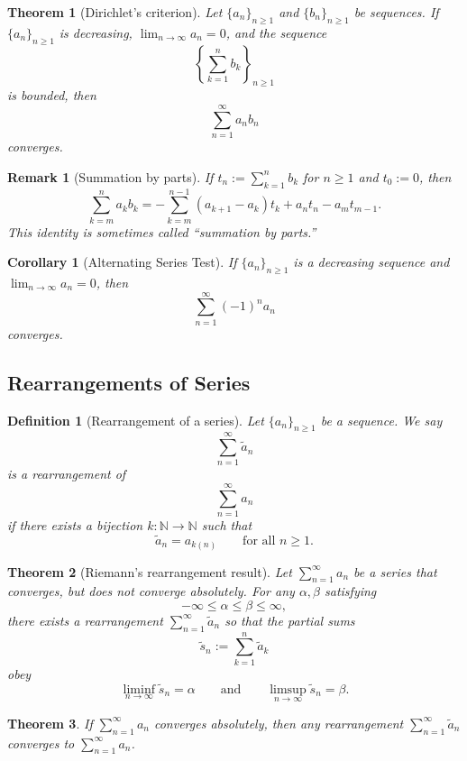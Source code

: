 \documentclass[12pt]{article}
\newtheorem*{remark}{Remark}
\newtheorem{theorem}{Theorem}
\newtheorem{corollary}{Corollary}
\newtheorem{definition}{Definition}
\begin{document}
\begin{theorem}[Dirichlet's criterion]
Let $\{a_n\}_{n\ge 1}$ and $\{b_n\}_{n\ge 1}$ be sequences. If
$\{a_n\}_{n\ge 1}$ is decreasing, $\lim_{n\to\infty} a_n=0$, and the sequence
\[
\left\{ \sum_{k=1}^{n} b_k \right\}_{n\ge 1}
\]
is bounded, then
\[
\sum_{n=1}^{\infty} a_n b_n
\]
converges.
\end{theorem}

\begin{remark}[Summation by parts]
If $t_n:=\sum_{k=1}^{n} b_k$ for $n\ge 1$ and $t_0:=0$, then
\[
\sum_{k=m}^{n} a_k b_k
= -\sum_{k=m}^{n-1} (a_{k+1}-a_k)t_k + a_n t_n - a_m t_{m-1}.
\]
This identity is sometimes called ``summation by parts.''
\end{remark}

\begin{corollary}[Alternating Series Test]
If $\{a_n\}_{n\ge 1}$ is a decreasing sequence and $\lim_{n\to\infty} a_n=0$,
then
\[
\sum_{n=1}^{\infty} (-1)^n a_n
\]
converges.
\end{corollary}

\subsection*{Rearrangements of Series}

\begin{definition}[Rearrangement of a series]
Let $\{a_n\}_{n\ge 1}$ be a sequence. We say
\[
\sum_{n=1}^{\infty} \tilde{a}_n
\]
is a rearrangement of
\[
\sum_{n=1}^{\infty} a_n
\]
if there exists a bijection $k:\mathbb{N}\to\mathbb{N}$ such that
\[
\tilde{a}_n = a_{k(n)}
\qquad \text{for all } n\ge 1.
\]
\end{definition}

\begin{theorem}[Riemann's rearrangement result]
Let $\sum_{n=1}^{\infty} a_n$ be a series that converges, but does not
converge absolutely. For any $\alpha,\beta$ satisfying
\[
-\infty\le \alpha\le \beta\le \infty,
\]
there exists a rearrangement $\sum_{n=1}^{\infty} \tilde{a}_n$ so that the
partial sums
\[
\tilde{s}_n := \sum_{k=1}^{n} \tilde{a}_k
\]
obey
\[
\liminf_{n\to\infty} \tilde{s}_n = \alpha
\qquad \text{and} \qquad
\limsup_{n\to\infty} \tilde{s}_n = \beta.
\]
\end{theorem}

\begin{theorem}
If $\sum_{n=1}^{\infty} a_n$ converges absolutely, then any rearrangement
$\sum_{n=1}^{\infty} \tilde{a}_n$ converges to $\sum_{n=1}^{\infty} a_n$.
\end{theorem}
\end{document}
